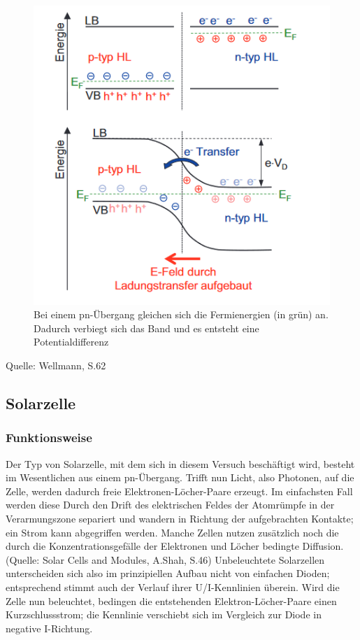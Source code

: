 \begin{figure}[h]
    \centering
    \includegraphics[scale=0.5]{Bilder/Bandverbiegung.png}
    \caption{Bei einem pn-Übergang gleichen sich die Fermienergien (in grün) an. Dadurch verbiegt sich das Band und es entsteht eine Potentialdifferenz}
\end{figure}

Quelle: Wellmann, S.62

\subsection{Solarzelle}
\subsubsection{Funktionsweise}
Der Typ von Solarzelle, mit dem sich in diesem Versuch beschäftigt wird, besteht im Wesentlichen aus einem pn-Übergang. Trifft nun Licht, also Photonen, auf die Zelle, werden dadurch freie Elektronen-Löcher-Paare erzeugt. Im einfachsten Fall werden diese Durch den Drift des elektrischen Feldes der Atomrümpfe in der Verarmungszone separiert und wandern in Richtung der aufgebrachten Kontakte; ein Strom kann abgegriffen werden. Manche Zellen nutzen zusätzlich noch die durch die Konzentrationsgefälle der Elektronen und Löcher bedingte Diffusion. (Quelle: Solar Cells and Modules, A.Shah, S.46) Unbeleuchtete Solarzellen unterscheiden sich also im prinzipiellen Aufbau nicht von einfachen Dioden; entsprechend stimmt auch der Verlauf ihrer U/I-Kennlinien überein. Wird die Zelle nun beleuchtet, bedingen die entstehenden Elektron-Löcher-Paare einen Kurzschlussstrom; die Kennlinie verschiebt sich im Vergleich zur Diode in negative I-Richtung. \\

